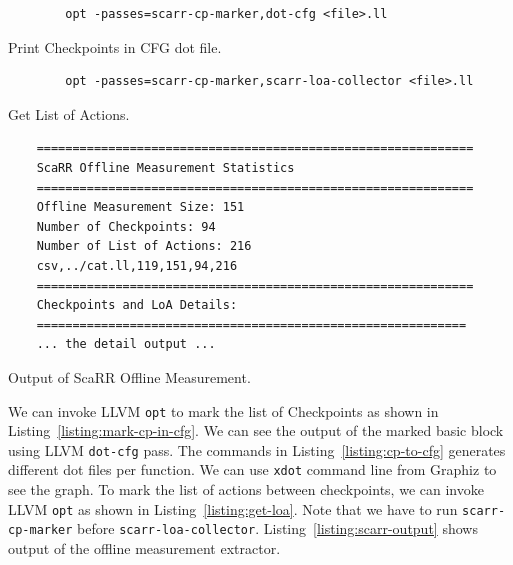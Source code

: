 \begin{listing}[h]
    \begin{verbatim}
        opt -passes=scarr-cp-marker,dot-cfg <file>.ll
    \end{verbatim}
    \caption{Print Checkpoints in CFG dot file.}    
    \label{listing:cp-to-cfg}
\end{listing}

\begin{listing}[h]
    \begin{verbatim}
        opt -passes=scarr-cp-marker,scarr-loa-collector <file>.ll
    \end{verbatim}
    \caption{Get List of Actions.}    
    \label{listing:get-loa}
\end{listing}

\begin{listing}[h]
    \begin{verbatim}
    =============================================================
    ScaRR Offline Measurement Statistics
    =============================================================
    Offline Measurement Size: 151
    Number of Checkpoints: 94
    Number of List of Actions: 216
    csv,../cat.ll,119,151,94,216
    =============================================================
    Checkpoints and LoA Details: 
    ============================================================
    ... the detail output ...
    \end{verbatim}
    \caption{Output of ScaRR Offline Measurement.}    
    \label{listing:scarr-output}
\end{listing}

We can invoke LLVM \texttt{opt} to mark the list of Checkpoints as shown in
Listing~\ref{listing:mark-cp-in-cfg}. We can see the output of the marked basic
block using LLVM \texttt{dot-cfg} pass. The commands in
Listing~\ref{listing:cp-to-cfg} generates different dot files per function. We
can use \texttt{xdot} command line from Graphiz to see the graph. To mark the
list of actions between checkpoints, we can invoke LLVM \texttt{opt} as shown in
Listing~\ref{listing:get-loa}. Note that we have to run \texttt{scarr-cp-marker}
before \texttt{scarr-loa-collector}. Listing~\ref{listing:scarr-output} shows
output of the offline measurement extractor.

